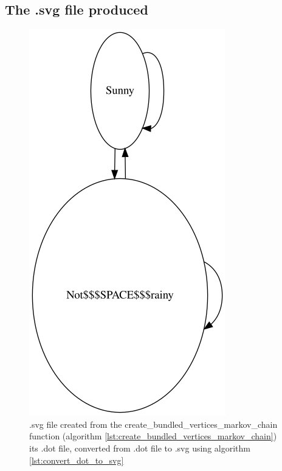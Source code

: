 

\subsection{The .svg file produced}

\begin{figure}[!htbp]
  \includegraphics[]{create_bundled_vertices_markov_chain.png}
  \caption{
    .svg file created from the create\_bundled\_vertices\_markov\_chain function
    (algorithm \ref{lst:create_bundled_vertices_markov_chain}) 
    its .dot file, converted from .dot file to .svg 
    using algorithm \ref{lst:convert_dot_to_svg}
  }
  \label{fig:create_bundled_vertices_markov_chain.svg}
\end{figure}


